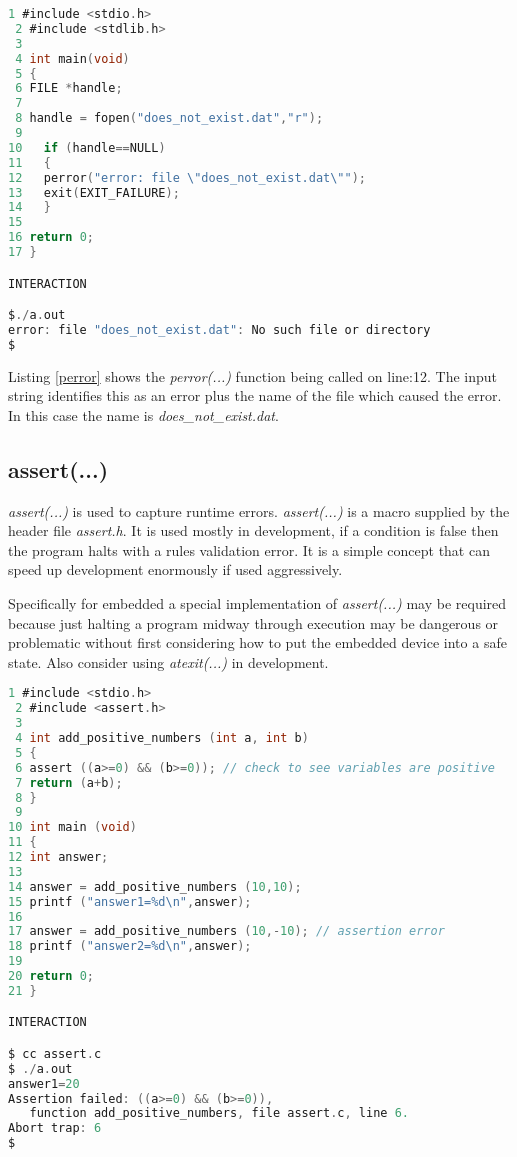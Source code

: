 \begin{lstlisting}[language=C,showstringspaces=false,caption={File perror.c, using perror(...)},captionpos=b,label=perror]
 1 #include <stdio.h>
 2 #include <stdlib.h>
 3  
 4 int main(void)
 5 {
 6 FILE *handle;
 7 
 8 handle = fopen("does_not_exist.dat","r");
 9
10   if (handle==NULL)
11   {
12   perror("error: file \"does_not_exist.dat\"");
13   exit(EXIT_FAILURE);
14   }
15
16 return 0;
17 }

INTERACTION

$./a.out
error: file "does_not_exist.dat": No such file or directory
$
\end{lstlisting}

Listing \ref{perror} shows the \textit{perror(...)} function being called on line:12. The input string identifies this as an error plus the name of the file which caused the error. In this case the name is \textit{does\_not\_exist.dat}.

\subsection{assert(...)} \label{assert}


\textit{assert(...)} is used to capture runtime errors. \textit{assert(...)} is a macro supplied by the header file \textit{assert.h}. It is used mostly in development, if a condition is false then the program halts with a rules validation error. It is a simple concept that can speed up development enormously if used aggressively.

Specifically for embedded a special implementation of \textit{assert(...)} may be required because just halting a program midway through execution may be dangerous or problematic without first considering how to put the embedded device into a safe state. Also consider using \textit{atexit(...)} in development.\\

\begin{lstlisting}[language=C,showstringspaces=false,caption={File assert.c, using  assert(...) macro},captionpos=b,label=assertex]
 1 #include <stdio.h>
 2 #include <assert.h>
 3  
 4 int add_positive_numbers (int a, int b)
 5 {
 6 assert ((a>=0) && (b>=0)); // check to see variables are positive
 7 return (a+b);
 8 }
 9
10 int main (void)
11 {
12 int answer;
13 
14 answer = add_positive_numbers (10,10);
15 printf ("answer1=%d\n",answer);
16
17 answer = add_positive_numbers (10,-10); // assertion error
18 printf ("answer2=%d\n",answer);
19
20 return 0;
21 }

INTERACTION

$ cc assert.c
$ ./a.out
answer1=20
Assertion failed: ((a>=0) && (b>=0)), 
   function add_positive_numbers, file assert.c, line 6.
Abort trap: 6
$
\end{lstlisting}

